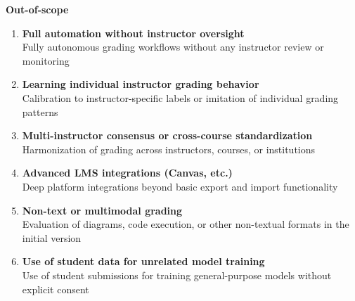 \documentclass[11pt]{article}
\begin{document}
\textbf{Out-of-scope}
\begin{enumerate}
    \item \textbf{Full automation without instructor oversight} \\
    Fully autonomous grading workflows without any instructor review or monitoring

    \item \textbf{Learning individual instructor grading behavior} \\
    Calibration to instructor-specific labels or imitation of individual grading patterns

    \item \textbf{Multi-instructor consensus or cross-course standardization} \\
    Harmonization of grading across instructors, courses, or institutions

    \item \textbf{Advanced LMS integrations (Canvas, etc.)} \\
    Deep platform integrations beyond basic export and import functionality

    \item \textbf{Non-text or multimodal grading} \\
    Evaluation of diagrams, code execution, or other non-textual formats in the initial version

    \item \textbf{Use of student data for unrelated model training} \\
    Use of student submissions for training general-purpose models without explicit consent
\end{enumerate}

\end{document}
